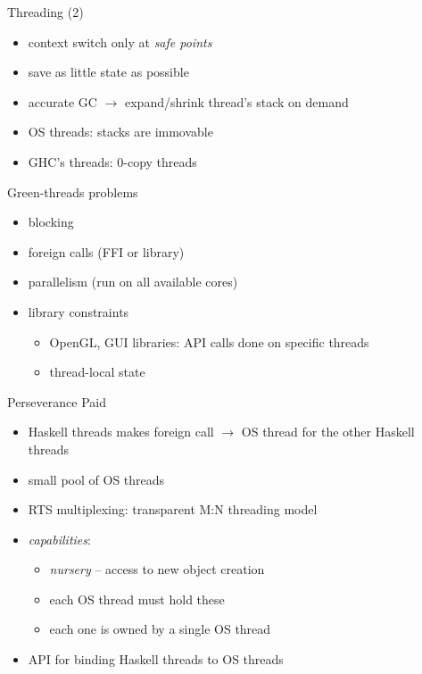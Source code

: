 \documentclass{beamer}
\begin{document}
\begin{frame}{Threading (2)}
  \begin{itemize}
    \item context switch only at \textit{safe points}
    \item save as little state as possible
    \pause
    \item accurate GC $\rightarrow$ expand/shrink thread's stack on demand
    \item OS threads: stacks are immovable
    \item GHC's threads: 0-copy threads
  \end{itemize}
\end{frame}

\begin{frame}{Green-threads problems}
  \begin{itemize}
    \item blocking
    \item foreign calls (FFI or library)
    \item parallelism (run on all available cores)
    \item library constraints
    \begin{itemize}
      \item OpenGL, GUI libraries: API calls done on specific threads
      \item thread-local state
    \end{itemize}
  \end{itemize}
\end{frame}

\begin{frame}{Perseverance Paid}
  \begin{itemize}
    \item Haskell threads makes foreign call $\rightarrow$ OS thread for the
    other Haskell threads
    \item small pool of OS threads
    \item RTS multiplexing: transparent M:N threading model
    \pause
    \item \textit{capabilities}:
    \begin{itemize}
      \item \textit{nursery} -- access to new object creation
      \item each OS thread must hold these
      \item each one is owned by a single OS thread
    \end{itemize}
    \pause
    \item API for binding Haskell threads to OS threads
  \end{itemize}
\end{frame}
\end{document}
